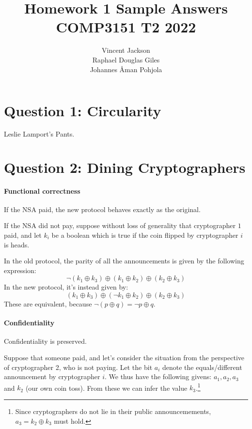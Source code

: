 \documentclass{article}
\begin{document}
\title{Homework 1 Sample Answers \\ COMP3151 T2 2022}
\author{Vincent Jackson \\ Raphael Douglas Giles \\ Johannes {\AA}man Pohjola}
\maketitle

\section{Question 1: Circularity}

Leslie Lamport's Pants.

\section {Question 2: Dining Cryptographers}

\paragraph{Functional correctness}
If the NSA paid, the new protocol behaves exactly as the original.

If the NSA did not pay, suppose without loss of generality that
cryptographer $1$ paid, and let $k_i$ be a boolean which is true
if the coin flipped by cryptographer $i$ is heads.

In the old protocol, the parity of all the announcements
is given by the following expression:
\[
\neg(k_1 \oplus k_3) \oplus (k_1 \oplus k_2) \oplus (k_2 \oplus k_3) 
\]
\noindent In the new protocol, it's instead given by:
\[
(k_1 \oplus k_3) \oplus (\neg k_1 \oplus k_2) \oplus (k_2 \oplus k_3)
\]
These are equivalent, because $\neg(p \oplus q) = \neg p \oplus q$.

\paragraph{Confidentiality}
Confidentiality is preserved.

Suppose that someone paid, and let's consider the
situation from the perspective of cryptographer 2, who is not paying.
Let the bit $a_i$ denote the equals/different announcement by
cryptographer $i$.
We thus have the following givens: $a_1,a_2,a_3$ and $k_2$ (our own coin toss).
From these we can infer the value $k_3$.\footnote{Since cryptographers do not lie
in their public announcemements, $a_3 = k_2 \oplus k_3$ must hold.}
\end{document}
